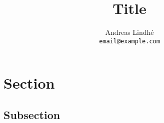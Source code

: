 \documentclass[a4paper]{article}
\title{Title}
\author{Andreas Lindhé\\
    \texttt{email@example.com}}
\begin{document}
\maketitle

\tableofcontents
\newpage

\abstract

\lipsum[1]

\section{Section}

\lipsum[2-3]

\subsection{Subsection}

\lipsum[1]




% 

%

\end{document}
